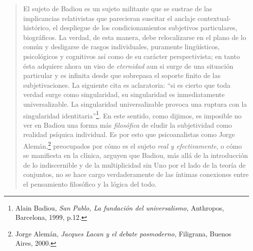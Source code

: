 \begin{quote}
El sujeto de Badiou es un sujeto militante que se sustrae de las implicancias relativistas que parecieran suscitar el anclaje contextual-histórico, el despliegue de los condicionamientos subjetivos particulares, biográficos. La verdad, de esta manera, debe relocalizarse en el plano de lo común y desligarse de rasgos individuales, puramente lingüísticos, psicológicos y cognitivos así como de su carácter perspectivista; en tanto ésta adquiere ahora un viso de \emph{eternidad} aun si surge de una situación particular y es infinita desde que sobrepasa el soporte finito de las subjetivaciones. La siguiente cita es aclaratoria: \enquote{si es cierto que toda verdad surge como singularidad, su singularidad es inmediatamente universalizable. La singularidad universalizable provoca una ruptura con la singularidad identitaria}\footnote{Alain Badiou, \emph{San Pablo, La fundación del universalismo,} Anthropos, Barcelona, 1999, p.12.}. En este sentido, como dijimos, es imposible no ver en Badiou una forma más \emph{filosófica} de eludir la subjetividad como realidad psíquica individual. Es por esto que psicoanalistas como Jorge Alemán,\footnote{Jorge Alemán, \emph{Jacques Lacan y el debate posmoderno,} Filigrana, Buenos Aires, 2000.} preocupados por cómo es el sujeto \emph{real y efectivamente,} o cómo se manifiesta en la clínica, arguyen que Badiou, más allá de la introducción de lo indiscernible y de la multiplicidad sin Uno por el lado de la teoría de conjuntos, no se hace cargo verdaderamente de las íntimas conexiones entre el pensamiento filosófico y la lógica del todo.


\end{quote}
